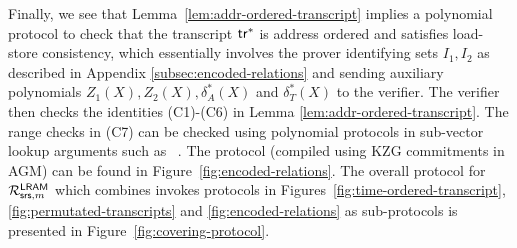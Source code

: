 Finally, we see that Lemma~\ref{lem:addr-ordered-transcript} implies a polynomial protocol to check that the transcript
$\mathsf{tr}^\ast$ is address ordered and satisfies load-store consistency, which
essentially involves the prover identifying sets
$I_1, I_2$ as described in Appendix \ref{subsec:encoded-relations} and sending auxiliary polynomials $Z_1(X),Z_2(X),\delta^\ast_A(X)$ and $\delta^\ast_T(X)$ to the verifier.
The verifier then checks the identities (C1)-(C6) in Lemma \ref{lem:addr-ordered-transcript}.
The range checks in (C7) can be checked using polynomial protocols in sub-vector lookup arguments such as
~\cite{EPRINT:PosKat22,EPRINT:EagFioGab22,PKC:CFFLL24,PKC:ZSG24}.
The protocol (compiled using KZG commitments in AGM) can be found in Figure~\ref{fig:encoded-relations}.
The overall protocol for $\mathcal{R}^{\mathsf{LRAM}}_{\mathsf{srs},m}$ which combines invokes protocols in Figures~\ref{fig:time-ordered-transcript},\ref{fig:permutated-transcripts}
and \ref{fig:encoded-relations} as sub-protocols is presented in Figure~\ref{fig:covering-protocol}.
